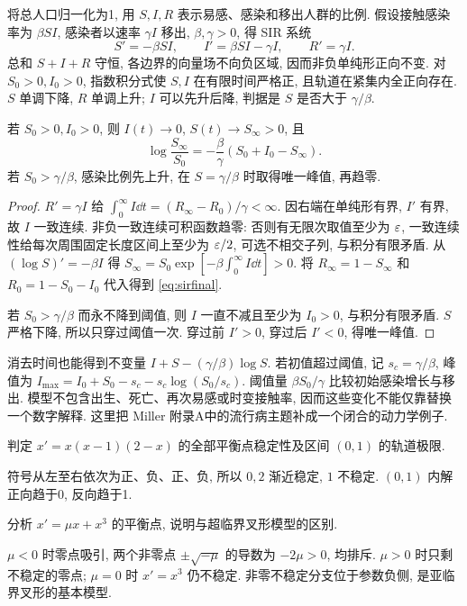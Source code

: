 将总人口归一化为1, 用 $S,I,R$ 表示易感、感染和移出人群的比例. 假设接触感染率为 $\beta SI$, 感染者以速率 $\gamma I$ 移出, $\beta,\gamma>0$, 得 SIR 系统
\[
S'=-\beta SI,\qquad I'=\beta SI-\gamma I,\qquad R'=\gamma I.
\]
总和 $S+I+R$ 守恒, 各边界的向量场不向负区域, 因而非负单纯形正向不变. 对 $S_0>0,I_0>0$, 指数积分式使 $S,I$ 在有限时间严格正, 且轨道在紧集内全正向存在. $S$ 单调下降, $R$ 单调上升; $I$ 可以先升后降, 判据是 $S$ 是否大于 $\gamma/\beta$.
\begin{proposition}
若 $S_0>0,I_0>0$, 则 $I(t)\to0$, $S(t)\to S_\infty>0$, 且
\begin{equation}\label{eq:sirfinal}
\log\frac{S_\infty}{S_0}=-\frac\beta\gamma(S_0+I_0-S_\infty).
\end{equation}
若 $S_0>\gamma/\beta$, 感染比例先上升, 在 $S=\gamma/\beta$ 时取得唯一峰值, 再趋零.
\end{proposition}
\begin{proof}
$R'=\gamma I$ 给 $\int_0^\infty I\dd t=(R_\infty-R_0)/\gamma<\infty$. 因右端在单纯形有界, $I'$ 有界, 故 $I$ 一致连续. 非负一致连续可积函数趋零: 否则有无限次取值至少为 $\varepsilon$, 一致连续性给每次周围固定长度区间上至少为 $\varepsilon/2$, 可选不相交子列, 与积分有限矛盾. 从 $(\log S)'=-\beta I$ 得 $S_\infty=S_0\exp[-\beta\int_0^\infty I\dd t]>0$. 将 $R_\infty=1-S_\infty$ 和 $R_0=1-S_0-I_0$ 代入得到 \eqref{eq:sirfinal}.

若 $S_0>\gamma/\beta$ 而永不降到阈值, 则 $I$ 一直不减且至少为 $I_0>0$, 与积分有限矛盾. $S$ 严格下降, 所以只穿过阈值一次. 穿过前 $I'>0$, 穿过后 $I'<0$, 得唯一峰值.
\end{proof}
消去时间也能得到不变量 $I+S-(\gamma/\beta)\log S$. 若初值超过阈值, 记 $s_c=\gamma/\beta$, 峰值为
$I_{\max}=I_0+S_0-s_c-s_c\log(S_0/s_c)$.
阈值量 $\beta S_0/\gamma$ 比较初始感染增长与移出. 模型不包含出生、死亡、再次易感或时变接触率, 因而这些变化不能仅靠替换一个数字解释. 这里把 Miller 附录A中的流行病主题补成一个闭合的动力学例子.

\begin{exercise}判定 $x'=x(x-1)(2-x)$ 的全部平衡点稳定性及区间 $(0,1)$ 的轨道极限.\end{exercise}
\begin{solution}符号从左至右依次为正、负、正、负, 所以 $0,2$ 渐近稳定, $1$ 不稳定. $(0,1)$ 内解正向趋于0, 反向趋于1.\end{solution}
\begin{exercise}分析 $x'=\mu x+x^3$ 的平衡点, 说明与超临界叉形模型的区别.\end{exercise}
\begin{solution}$\mu<0$ 时零点吸引, 两个非零点 $\pm\sqrt{-\mu}$ 的导数为 $-2\mu>0$, 均排斥. $\mu>0$ 时只剩不稳定的零点; $\mu=0$ 时 $x'=x^3$ 仍不稳定. 非零不稳定分支位于参数负侧, 是亚临界叉形的基本模型.\end{solution}
